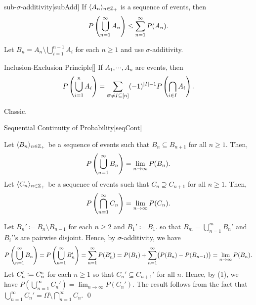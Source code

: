 \documentclass[../complex_variables_1.tex]{subfiles}
\begin{document}
\begin{Lemma}{sub-\(\sigma\)-additivity}[subAdd]
    If \(\lang A_n \rang_{n \in \ZZ_+}\) is a sequence of events, then
    \[
        P\left( \bigcup_{n=1}^\infty A_n \right) \le \sum_{n=1}^\infty P(A_n)\text.
    \]
\end{Lemma}
\begin{myproof}[Proof]
    Let \(B_n = A_n \setminus \bigcup_{i=1}^{n-1} A_i\)
    for each \(n \ge 1\) and use \(\sigma\)-additivity.
\end{myproof}

\begin{Lemma}{Inclusion-Exclusion Principle}[]
    If \(A_1, \cdots, A_n\) are events, then
    \[
        P \left( \bigcup_{i=1}^n A_i \right)
        = \sum_{\varnothing \neq I \subseteq [n]} (-1)^{|I| - 1} P \left( \bigcap_{i \in I} A_i
        \right)\text.
    \]
\end{Lemma}
\begin{myproof}[Proof]
    Classic.
\end{myproof}

\begin{Theorem}{Sequential Continuity of Probability}[seqCont]
    \begin{enumerate}[label=(\arabic*), ref=\protect{\Cref{th:seqCont} (\arabic*)}]
        \ii\label{itm:seqCont.1}
        Let \(\lang B_n \rang_{n \in \ZZ_+}\) be a sequence of events such that
        \(B_n \subseteq B_{n+1}\) for all \(n \ge 1\). Then,
        \[
            P\left( \bigcup_{n=1}^\infty B_n \right) = \lim_{n \to \infty} P(B_n)\text.
        \]
        \ii\label{itm:seqCont.2}
        Let \(\lang C_n \rang_{n \in \ZZ_+}\) be a sequence of events such that
        \(C_n \supseteq C_{n+1}\) for all \(n \ge 1\). Then,
        \[
            P\left( \bigcap_{n=1}^\infty C_n \right) = \lim_{n \to \infty} P(C_n)\text.
        \]
    \end{enumerate}
\end{Theorem}
\begin{myclaim}[Proof]\hfill
\begin{enumerate}[label=(\arabic*)]
    \ii
    Let \(B_n' \coloneqq B_n \setminus B_{n-1}\) for each \(n \ge 2\) and \(B_1' \coloneqq B_1\).
    so that \(B_m = \bigcup_{n=1}^m B_n'\)
    and \(B_i'\)'s are pairwise disjoint.
    Hence, by \(\sigma\)-additivity, we have
    \[
        P\left( \bigcup_{n=1}^\infty B_n \right) =
        P\left( \bigcup_{n=1}^\infty B_n' \right) =
        \sum_{n=1}^\infty P(B_n') =
        P(B_1) + \sum_{n=1}^\infty \bigl( P(B_n) - P(B_{n-1}) \bigr) =
        \lim_{n \to \infty} P(B_n)\text.
    \]
    \ii
    Let \(C_n' \coloneqq C_n^{\mathsf{c}}\) for each \(n \ge 1\)
    so that \(C_n' \subseteq C_{n+1}'\) for all \(n\).
    Hence, by (1), we have \(P\left( \bigcup_{n=1}^\infty C_n' \right) = \lim_{n \to \infty}
    P(C_n')\). The result follows from the fact that
    \(\bigcup_{n=1}^\infty C_n' = \Omega \setminus \bigcap_{n=1}^\infty C_n\).
    \qed
\end{enumerate}
\end{myclaim}
\end{document}

